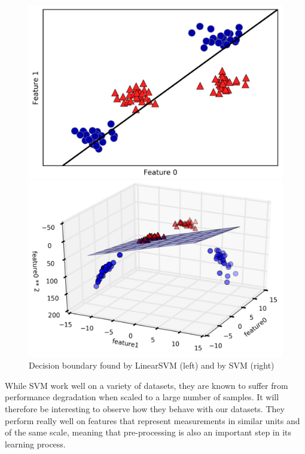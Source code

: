 \begin{figure}[ht]
\centering
    \begin{minipage}[b]{0.485\linewidth}
    \includegraphics[width=\linewidth]{Figures/SVM1.png}
\end{minipage}
\quad
\begin{minipage}[b]{0.45\linewidth}
    \includegraphics[width=\linewidth]{Figures/SVM2.png}
\end{minipage}
\caption{Decision boundary found by LinearSVM (left) and by SVM (right) \cite{ML}}
\label{fig:SVM}
\end{figure}

While SVM work well on a variety of datasets, they are known to suffer from performance degradation when scaled to a large number of samples. It will therefore be interesting to observe how they behave with our datasets. They perform really well on features that represent measurements in similar units and of the same scale, meaning that pre-processing is also an important step in its learning process.

